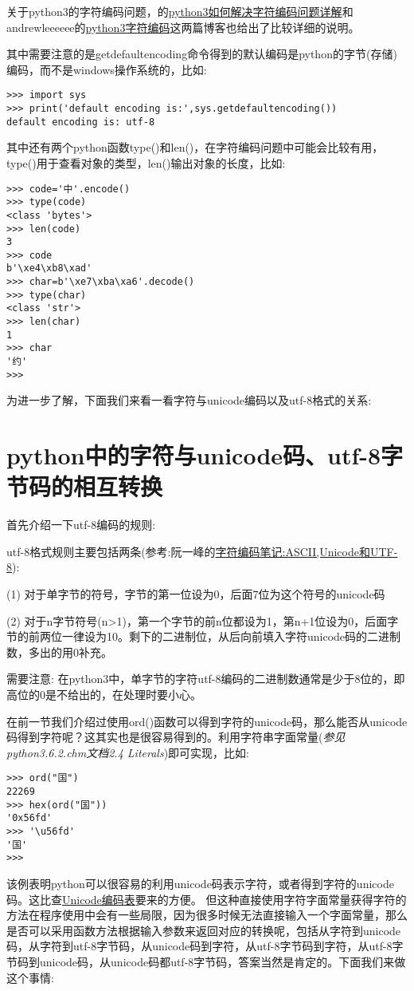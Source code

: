 \documentclass[twoside,11pt]{book}
\begin{document}
关于python3的字符编码问题，的\href{www.unicode.org}{python3如何解决字符编码问题详解}和andrewleeeeee的\href{www.unicode.org}{python3字符编码}这两篇博客也给出了比较详细的说明。

其中需要注意的是getdefaultencoding命令得到的默认编码是python的字节(存储)编码，而不是windows操作系统的，比如:
\begin{lstlisting}
>>> import sys
>>> print('default encoding is:',sys.getdefaultencoding())
default encoding is: utf-8
\end{lstlisting}

其中还有两个python函数type()和len()，在字符编码问题中可能会比较有用，type()用于查看对象的类型，len()输出对象的长度，比如:
\begin{lstlisting}
>>> code='中'.encode()
>>> type(code)
<class 'bytes'>
>>> len(code)
3
>>> code
b'\xe4\xb8\xad'
>>> char=b'\xe7\xba\xa6'.decode()
>>> type(char)
<class 'str'>
>>> len(char)
1
>>> char
'约'
>>>
\end{lstlisting}

为进一步了解，下面我们来看一看字符与unicode编码以及utf-8格式的关系:

\section{python中的字符与unicode码、utf-8字节码的相互转换}
首先介绍一下utf-8编码的规则:

utf-8格式规则主要包括两条(参考:阮一峰的\href{www.sohu.com}{字符编码笔记:ASCII,Unicode和UTF-8}):

(1) 对于单字节的符号，字节的第一位设为0，后面7位为这个符号的unicode码

(2) 对于n字节符号(n>1)，第一个字节的前n位都设为1，第n+1位设为0，后面字节的前两位一律设为10。剩下的二进制位，从后向前填入字符unicode码的二进制数，多出的用0补充。

需要注意: 在python3中，单字节的字符utf-8编码的二进制数通常是少于8位的，即高位的0是不给出的，在处理时要小心。

在前一节我们介绍过使用ord()函数可以得到字符的unicode码，那么能否从unicode码得到字符呢？这其实也是很容易得到的。利用字符串字面常量(\emph{参见python3.6.2.chm文档2.4 Literals})即可实现，比如:

\begin{lstlisting}
>>> ord("国")
22269
>>> hex(ord("国"))
'0x56fd'
>>> '\u56fd'
'国'
>>>
\end{lstlisting}

该例表明python可以很容易的利用unicode码表示字符，或者得到字符的unicode码。这比查\href{www.unicode.org}{Unicode编码表}要来的方便。
但这种直接使用字符字面常量获得字符的方法在程序使用中会有一些局限，因为很多时候无法直接输入一个字面常量，那么是否可以采用函数方法根据输入参数来返回对应的转换呢，包括从字符到unicode码，从字符到utf-8字节码，从unicode码到字符，从utf-8字节码到字符，从utf-8字节码到unicode码，从unicode码都utf-8字节码，答案当然是肯定的。下面我们来做这个事情:
\end{document}
